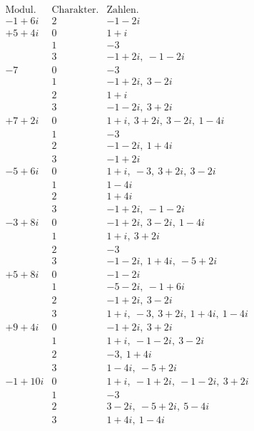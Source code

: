 %
\[
\begin{array}{r|c|l}
\text{Modul.}&\text{Charakter.}&\text{Zahlen.}\\\hline
-1+6i&2&-1-2i\\
+5+4i&0&1+i\\
&1&-3\\
&3&-1+2i,\ -1-2i\\
-7&0&-3\\
&1&-1+2i,\ 3-2i\\
&2&1+i\\
&3&-1-2i,\ 3+2i\\
+7+2i&0&1+i,\ 3+2i,\ 3-2i,\ 1-4i\\
&1&-3\\
&2&-1-2i,\ 1+4i\\
&3&-1+2i\\
-5+6i&0&1+i,\ -3,\ 3+2i,\ 3-2i\\
&1&1-4i\\
&2&1+4i\\
&3&-1+2i,\ -1-2i\\
-3+8i&0&-1+2i,\ 3-2i,\ 1-4i\\
&1&1+i,\ 3+2i\\
&2&-3\\
&3&-1-2i,\ 1+4i,\ -5+2i\\
+5+8i&0&-1-2i\\
&1&-5-2i,\ -1+6i\\
&2&-1+2i,\ 3-2i\\
&3&1+i,\ -3,\ 3+2i,\ 1+4i,\ 1-4i\\
+9+4i&0&-1+2i,\ 3+2i\\
&1&1+i,\ -1-2i,\ 3-2i\\
&2&-3,\ 1+4i\\
&3&1-4i,\ -5+2i\\
-1+10i&0&1+i,\ -1+2i,\ -1-2i,\ 3+2i\\
&1&-3\\
&2&3-2i,\ -5+2i,\ 5-4i\\
&3&1+4i,\ 1-4i
\end{array}
\]

